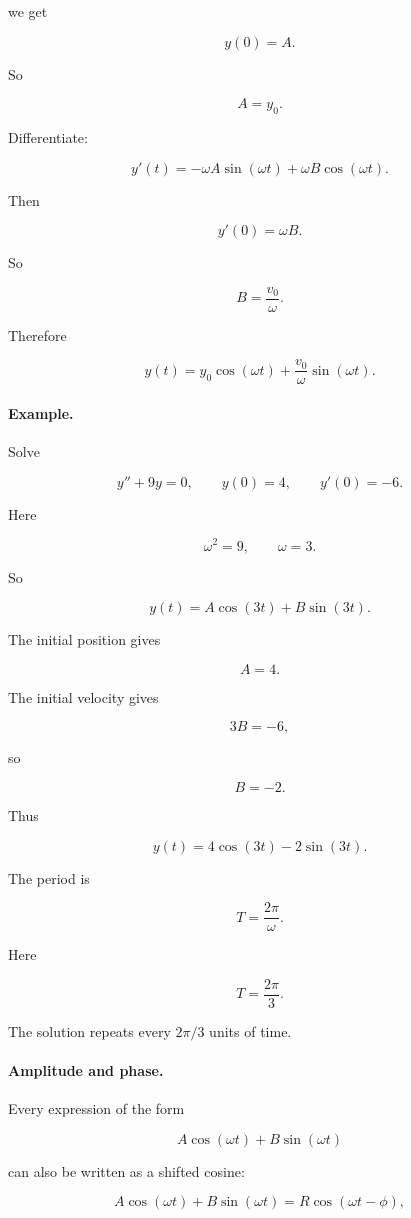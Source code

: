 we get

\[
y(0)=A.
\]

So

\[
A=y_0.
\]

Differentiate:

\[
y'(t)
=
-\omega A\sin(\omega t)+\omega B\cos(\omega t).
\]

Then

\[
y'(0)=\omega B.
\]

So

\[
B=\frac{v_0}{\omega}.
\]

Therefore

\[
\boxed{
y(t)=y_0\cos(\omega t)+\frac{v_0}{\omega}\sin(\omega t).
}
\]

\paragraph{Example.}
Solve

\[
y''+9y=0,
\qquad
y(0)=4,
\qquad
y'(0)=-6.
\]

Here

\[
\omega^2=9,
\qquad
\omega=3.
\]

So

\[
y(t)=A\cos(3t)+B\sin(3t).
\]

The initial position gives

\[
A=4.
\]

The initial velocity gives

\[
3B=-6,
\]

so

\[
B=-2.
\]

Thus

\[
\boxed{
y(t)=4\cos(3t)-2\sin(3t).
}
\]

The period is

\[
\boxed{
T=\frac{2\pi}{\omega}.
}
\]

Here

\[
T=\frac{2\pi}{3}.
\]

The solution repeats every \(2\pi/3\) units of time.

\paragraph{Amplitude and phase.}
Every expression of the form

\[
A\cos(\omega t)+B\sin(\omega t)
\]

can also be written as a shifted cosine:

\[
\boxed{
A\cos(\omega t)+B\sin(\omega t)=R\cos(\omega t-\phi),
}
\]

